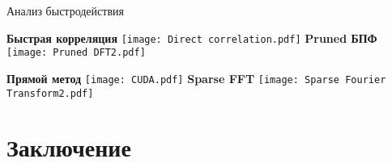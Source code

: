 \begin{frame}{Анализ быстродействия}
	\begin{minipage}[t]{0.45\linewidth}
	\centering 
	\textbf{Быстрая корреляция}
	\texttt{[image: Direct correlation.pdf]}
	\textbf{Pruned БПФ}
	\texttt{[image: Pruned DFT2.pdf]}		
\end{minipage}
\hfill
\begin{minipage}[t]{0.45\linewidth}
	\centering 
	\textbf{Прямой метод}
	\texttt{[image: CUDA.pdf]}
	\textbf{Sparse FFT}
	\texttt{[image: Sparse Fourier Transform2.pdf]}
\end{minipage}
\end{frame}



\section{Заключение}

